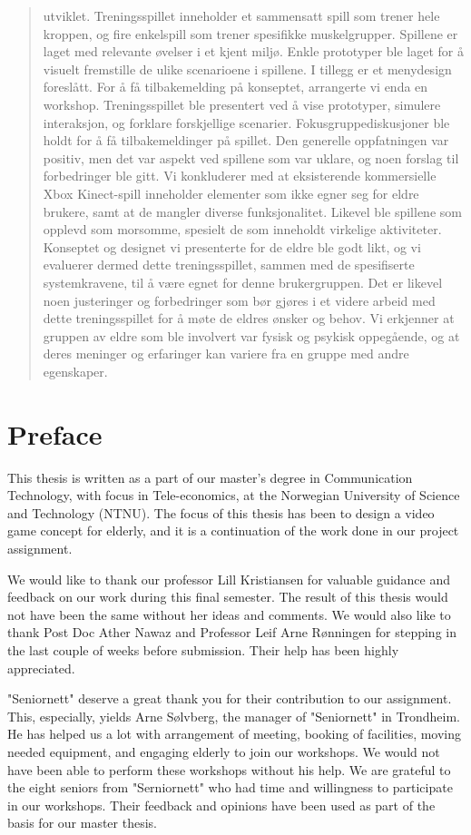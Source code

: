 \documentclass[b5paper,twoside,openright,11pt]{report}
\begin{document}
\begin{abstract}
utviklet. Treningsspillet inneholder et sammensatt spill som trener hele kroppen, og fire enkelspill som trener spesifikke muskelgrupper. Spillene er laget med relevante øvelser i et kjent miljø. Enkle prototyper ble laget for å visuelt fremstille de ulike scenarioene i spillene. I tillegg er et menydesign foreslått. For å få tilbakemelding på konseptet, arrangerte vi enda en workshop. Treningsspillet ble presentert ved å vise prototyper, simulere interaksjon, og forklare forskjellige scenarier. Fokusgruppediskusjoner ble holdt for å få tilbakemeldinger på spillet. Den generelle oppfatningen var positiv, men det var aspekt ved spillene som var uklare, og noen forslag til forbedringer ble gitt. Vi konkluderer med at eksisterende kommersielle Xbox Kinect-spill inneholder elementer som ikke egner seg for eldre brukere, samt at de mangler diverse funksjonalitet. Likevel ble spillene som opplevd som morsomme, spesielt de som inneholdt virkelige aktiviteter. Konseptet og designet vi presenterte for de eldre ble godt likt, og vi evaluerer dermed  dette treningsspillet, sammen med de spesifiserte systemkravene, til å være egnet for denne brukergruppen. Det er likevel noen justeringer og forbedringer som bør gjøres i et videre arbeid med dette treningsspillet for å møte de eldres ønsker og behov. Vi erkjenner at gruppen av eldre som ble involvert var fysisk og psykisk oppegående, og at deres meninger og erfaringer kan variere fra en gruppe med andre egenskaper. 
\end{abstract}
\cleardoublepage
\chapter*{Preface}
This thesis is written as a part of our master's degree in Communication Technology, with focus in Tele-economics, at the Norwegian University of Science and Technology (NTNU). The focus of this thesis has been to design a video game concept for elderly, and it is a continuation of the work done in our project assignment. 

We would like to thank our professor Lill Kristiansen for valuable guidance and feedback on our work during this final semester. The result of this thesis would not have been the same without her ideas and comments. We would also like to thank Post Doc Ather Nawaz and Professor Leif Arne Rønningen for stepping in the last couple of weeks before submission. Their help has been highly appreciated.  

"Seniornett" deserve a great thank you for their contribution to our assignment. This, especially, yields Arne Sølvberg, the manager of "Seniornett" in Trondheim. He has helped us a lot with arrangement of meeting, booking of facilities, moving needed equipment, and engaging elderly to join our workshops. We would not have been able to perform these workshops without his help. We are grateful to the eight seniors from "Serniornett" who had time and willingness to participate in our workshops. Their feedback and opinions have been used as part of the basis for our master thesis. 
\end{document}
